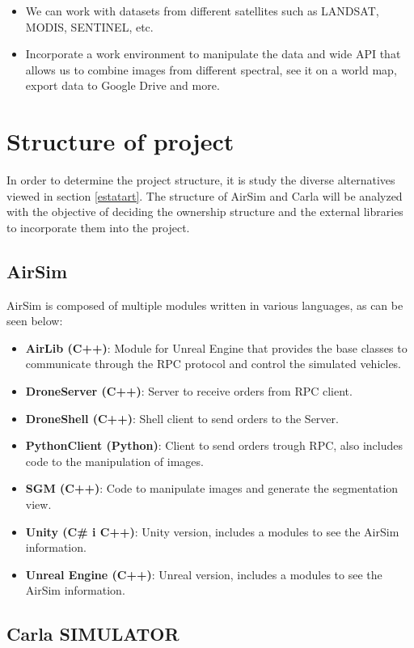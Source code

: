 \documentclass[10pt,a4paper,twocolumn,twoside]{article}
\begin{document}
\begin{itemize}
\setlength\itemsep{0em}
  \item We can work with datasets from different satellites such as LANDSAT, MODIS, SENTINEL, etc.
  \item Incorporate a work environment to manipulate the data and wide API that allows us to combine images from different spectral, see it on a world map, export data to Google Drive and more.
\end{itemize}

\section{Structure of project}
In order to determine the project structure, it is study the diverse alternatives viewed in section \ref{estatart}. The structure of AirSim and Carla will be analyzed with the objective of deciding the ownership structure and the external libraries to incorporate them into the project.

\subsection{AirSim} 
AirSim is composed of multiple modules written in various languages, as can be seen below:

\begin{itemize}
\setlength\itemsep{0em}
	\item \textbf{AirLib (C++)}: Module for Unreal Engine that provides the base classes to communicate through the RPC protocol and control the simulated vehicles.
	\item \textbf{DroneServer (C++)}: Server to receive orders from RPC client.
  	\item \textbf{DroneShell (C++)}: Shell client to send orders to the Server.
  	\item \textbf{PythonClient (Python)}: Client to send orders trough RPC, also includes code to the manipulation of images.
  	\item \textbf{SGM (C++)}: Code to manipulate images and generate the segmentation view.
    \item \textbf{Unity (C\# i C++)}: Unity version, includes a modules to see the AirSim information.
    \item \textbf{Unreal Engine (C++)}: Unreal version, includes a modules to see the AirSim information.
\end{itemize}

\subsection{Carla SIMULATOR}
\end{document}
